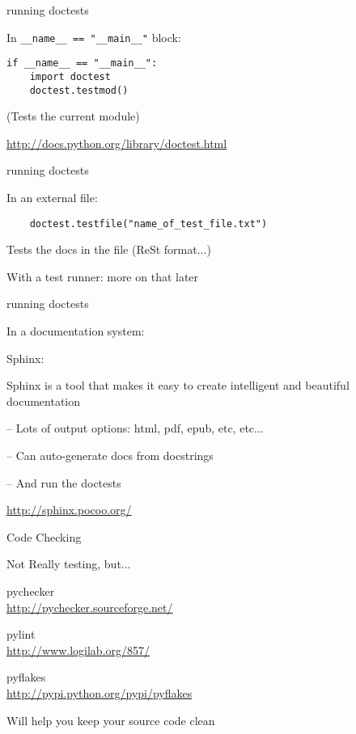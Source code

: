 \documentclass{beamer}
\begin{document}
\begin{frame}[fragile]{running doctests}

{\large In \verb|__name__ == "__main__"| block:}

\begin{verbatim}
if __name__ == "__main__":
    import doctest
    doctest.testmod()
\end{verbatim}

{\large (Tests the current module) }


\vfill
\url{http://docs.python.org/library/doctest.html}

\end{frame} 

\begin{frame}[fragile]{running doctests}

\vfill
{\large In an external file:}

\begin{verbatim}
    doctest.testfile("name_of_test_file.txt")
\end{verbatim}

{\large Tests the docs in the file (ReSt format...) }


\vfill
{\large With a test runner: more on that later}

\vfill
\end{frame} 

\begin{frame}[fragile]{running doctests}

\vfill
{\large In a documentation system:}

\vfill
{\LARGE Sphinx:}

\vfill
{\Large Sphinx is a tool that makes it easy to create intelligent and beautiful documentation}

\vfill
{\Large -- Lots of output options: html, pdf, epub, etc, etc...}

\vfill
{\Large -- Can auto-generate docs from docstrings}

\vfill
{\Large -- And run the doctests}

\vfill
\url{http://sphinx.pocoo.org/}
\end{frame} 

\begin{frame}[fragile]{Code Checking}

{\LARGE Not Really testing, but...}

\vfill
{\LARGE pychecker}\\
\url{http://pychecker.sourceforge.net/}

\vfill
{\LARGE pylint}\\
\url{http://www.logilab.org/857/}

\vfill
{\LARGE pyflakes}\\
\url{http://pypi.python.org/pypi/pyflakes}

\vfill
{\Large Will help you keep your source code clean}

\end{frame} 
\end{document}
